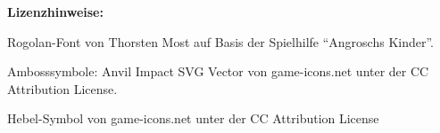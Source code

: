 \documentclass[openright]{Ilaris}
\begin{document}
\vfill
\footnotesize
\textbf{Lizenzhinweise:}

Rogolan-Font von Thorsten Most auf Basis der Spielhilfe \enquote{Angroschs Kinder}.

Ambosssymbole: Anvil Impact SVG Vector von game-icons.net unter der CC Attribution License.

Hebel-Symbol von game-icons.net unter der CC Attribution License
\end{document}
